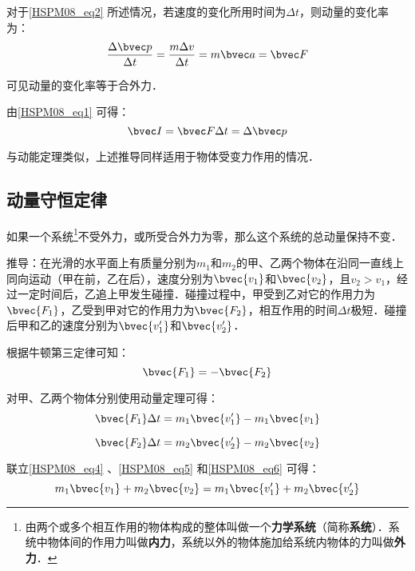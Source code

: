 对于\autoref{HSPM08_eq2} 所述情况，若速度的变化所用时间为$\Delta t$，则动量的变化率为：
\begin{equation}\label{HSPM08_eq1}
\frac{\Delta \bvec p}{\Delta t}=\frac{m\Delta v}{\Delta t}=m\bvec a=\bvec F
\end{equation}

可见动量的变化率等于合外力．

由\autoref{HSPM08_eq1} 可得：
\begin{equation}\label{HSPM08_eq3}
\bvec I=\bvec F\Delta t=\Delta \bvec p
\end{equation}

与动能定理类似，上述推导同样适用于物体受变力作用的情况．

\subsection{动量守恒定律}

如果一个系统\footnote{由两个或多个相互作用的物体构成的整体叫做一个\textbf{力学系统}（简称\textbf{系统}）．系统中物体间的作用力叫做\textbf{内力}，系统以外的物体施加给系统内物体的力叫做\textbf{外力}．}不受外力，或所受合外力为零，那么这个系统的总动量保持不变．

推导：在光滑的水平面上有质量分别为$m_1$和$m_2$的甲、乙两个物体在沿同一直线上同向运动（甲在前，乙在后），速度分别为$\bvec{v_1}$和$\bvec{v_2}$，且$v_2>v_1$，经过一定时间后，乙追上甲发生碰撞．碰撞过程中，甲受到乙对它的作用力为$\bvec {F_1}$，乙受到甲对它的作用力为$\bvec {F_2}$，相互作用的时间$\Delta t$极短．碰撞后甲和乙的速度分别为$\bvec{v_1'}$和$\bvec{v_2'}$．

根据牛顿第三定律可知：
\begin{equation}\label{HSPM08_eq4}
\bvec {F_1}=-\bvec{F_2}
\end{equation}

对甲、乙两个物体分别使用动量定理可得：
\begin{equation}\label{HSPM08_eq5}
\bvec{F_1}\Delta t=m_1\bvec{v_1'}-m_1\bvec{v_1}
\end{equation}

\begin{equation}\label{HSPM08_eq6}
\bvec{F_2}\Delta t=m_2\bvec{v_2'}-m_2\bvec{v_2}
\end{equation}

联立\autoref{HSPM08_eq4} 、\autoref{HSPM08_eq5} 和\autoref{HSPM08_eq6} 可得：
\begin{equation}
m_1\bvec{v_1}+ m_2\bvec{v_2}= m_1\bvec{v_1'}+ m_2\bvec{v_2'}
\end{equation}

